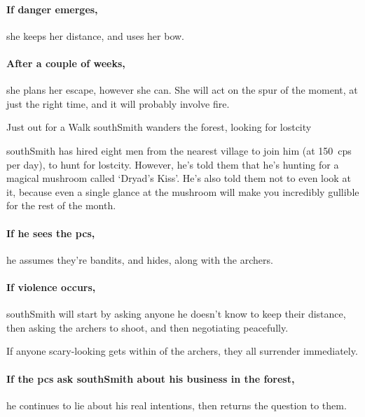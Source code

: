 \paragraph{If danger emerges,}
she keeps her distance, and uses her bow.

\paragraph{After a couple of weeks,}
she plans her escape, however she can.
She will act on the spur of the moment, at just the right time, and it will probably involve fire.

{Just out for a Walk}%
{\Gls{southSmith} wanders the forest, looking for \gls{lostcity}}%

\Gls{southSmith} has hired eight men from the nearest \gls{village} to join him (at 150~\glspl{cp} per day), to hunt for \gls{lostcity}.
However, he's told them that he's hunting for a magical mushroom called `Dryad's Kiss'.%
He's also told them not to even look at it, because even a single glance at the mushroom will make you incredibly gullible for the rest of the month.

\renewcommand\npcQuote{You don't need to trust us to speak politely.  Can we start again?}
\southSmith

\paragraph{If he sees the \glspl{pc},}
he assumes they're bandits, and hides, along with the archers.


\paragraph{If violence occurs,}
\gls{southSmith} will start by asking anyone he doesn't know to keep their distance, then asking the archers to shoot, and then negotiating peacefully.

If anyone scary-looking gets within  of the archers, they all surrender immediately.

\paragraph{If the \glspl{pc} ask \gls{southSmith} about his business in the forest,}
he continues to lie about his real intentions, then returns the question to them.

